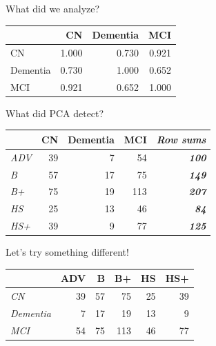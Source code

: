 \documentclass[
  ignorenonframetext,
]{beamer}
\begin{document}
\begin{frame}{What did we analyze?}
\protect\hypertarget{what-did-we-analyze}{}

\begin{table}[H]
\centering
\begin{tabular}{lrrr}
\toprule
  & CN & Dementia & MCI\\
\midrule
CN & 1.000 & 0.730 & 0.921\\
Dementia & 0.730 & 1.000 & 0.652\\
MCI & 0.921 & 0.652 & 1.000\\
\bottomrule
\end{tabular}
\end{table}

\end{frame}

\begin{frame}{What did PCA detect?}
\protect\hypertarget{what-did-pca-detect}{}

\begin{table}[H]
\centering
\begin{tabular}{>{\em}lrrr>{\bfseries\em}r}
\toprule
  & CN & Dementia & MCI & Row sums\\
\midrule
ADV & 39 & 7 & 54 & 100\\
B & 57 & 17 & 75 & 149\\
B+ & 75 & 19 & 113 & 207\\
HS & 25 & 13 & 46 & 84\\
HS+ & 39 & 9 & 77 & 125\\
\bottomrule
\end{tabular}
\end{table}

\end{frame}

\begin{frame}{Let's try something different!}
\protect\hypertarget{lets-try-something-different}{}

\end{frame}

\begin{frame}

\begin{table}[H]
\centering
\begin{tabular}{>{\em}lrrrrr}
\toprule
  & ADV & B & B+ & HS & HS+\\
\midrule
CN & 39 & 57 & 75 & 25 & 39\\
Dementia & 7 & 17 & 19 & 13 & 9\\
MCI & 54 & 75 & 113 & 46 & 77\\
\bottomrule
\end{tabular}
\end{table}

\end{frame}
\end{document}
